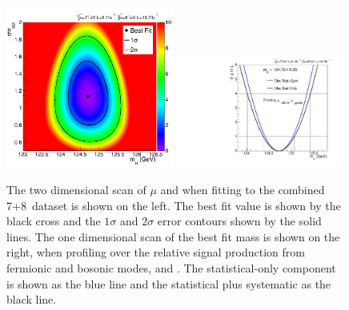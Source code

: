 \begin{figure}
  \includegraphics[width=0.49\textwidth]{results/plots/mva_mumh_scan.png}
  \includegraphics[width=0.49\textwidth]{results/plots/mva_mh_scan.pdf}
  \caption[2D \NLL scans of $\mu$ and \mH]{The two dimensional \NLL scan of $\mu$ and \mH when fitting to the combined 7+8~\TeV dataset is shown on the left. The best fit value is shown by the black cross and the $1\sigma$ and $2\sigma$ error contours shown by the solid lines. The one dimensional \NLL scan of the best fit mass \mH is shown on the right, when profiling over the relative signal production from fermionic and bosonic modes, \RF and \RV. The statistical-only component is shown as the blue line and the statistical plus systematic as the black line.}
  \label{fig:res_mumh2}
\end{figure}


